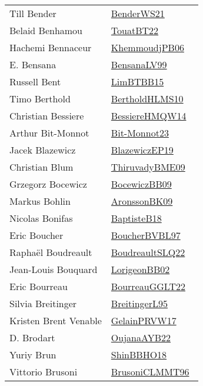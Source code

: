 {\begin{longtable}{p{4cm}p{20cm}}
Till Bender & \href{works/BenderWS21.pdf}{BenderWS21}~\cite{BenderWS21}\\
Belaid Benhamou & \href{works/TouatBT22.pdf}{TouatBT22}~\cite{TouatBT22}\\
Hachemi Bennaceur & \href{works/KhemmoudjPB06.pdf}{KhemmoudjPB06}~\cite{KhemmoudjPB06}\\
E. Bensana & \href{works/BensanaLV99.pdf}{BensanaLV99}~\cite{BensanaLV99}\\
Russell Bent & \href{works/LimBTBB15.pdf}{LimBTBB15}~\cite{LimBTBB15}\\
Timo Berthold & \href{works/BertholdHLMS10.pdf}{BertholdHLMS10}~\cite{BertholdHLMS10}\\
Christian Bessiere & \href{works/BessiereHMQW14.pdf}{BessiereHMQW14}~\cite{BessiereHMQW14}\\
Arthur Bit{-}Monnot & \href{works/Bit-Monnot23.pdf}{Bit-Monnot23}~\cite{Bit-Monnot23}\\
Jacek Blazewicz & \href{}{BlazewiczEP19}~\cite{BlazewiczEP19}\\
Christian Blum & \href{works/ThiruvadyBME09.pdf}{ThiruvadyBME09}~\cite{ThiruvadyBME09}\\
Grzegorz Bocewicz & \href{}{BocewiczBB09}~\cite{BocewiczBB09}\\
Markus Bohlin & \href{works/AronssonBK09.pdf}{AronssonBK09}~\cite{AronssonBK09}\\
Nicolas Bonifas & \href{works/BaptisteB18.pdf}{BaptisteB18}~\cite{BaptisteB18}\\
Eric Boucher & \href{}{BoucherBVBL97}~\cite{BoucherBVBL97}\\
Rapha{\"{e}}l Boudreault & \href{works/BoudreaultSLQ22.pdf}{BoudreaultSLQ22}~\cite{BoudreaultSLQ22}\\
Jean{-}Louis Bouquard & \href{}{LorigeonBB02}~\cite{LorigeonBB02}\\
Eric Bourreau & \href{works/BourreauGGLT22.pdf}{BourreauGGLT22}~\cite{BourreauGGLT22}\\
Silvia Breitinger & \href{}{BreitingerL95}~\cite{BreitingerL95}\\
Kristen Brent Venable & \href{works/GelainPRVW17.pdf}{GelainPRVW17}~\cite{GelainPRVW17}\\
D. Brodart & \href{works/OujanaAYB22.pdf}{OujanaAYB22}~\cite{OujanaAYB22}\\
Yuriy Brun & \href{works/ShinBBHO18.pdf}{ShinBBHO18}~\cite{ShinBBHO18}\\
Vittorio Brusoni & \href{works/BrusoniCLMMT96.pdf}{BrusoniCLMMT96}~\cite{BrusoniCLMMT96}\\

\end{longtable}}
